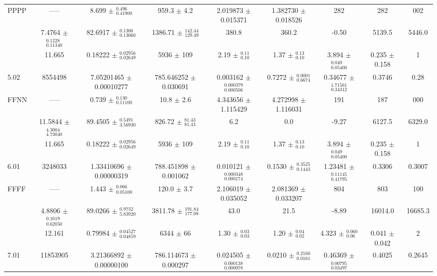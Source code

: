 \documentclass{aastex62}
\begin{document}
\begin{longrotatetable}
\begin{table}[!hbt]
\begin{tabular}{l c c c c c c c c}
PPPP & ----- & 8.699 $\pm$ $^{ 0.496 } _{ 0.41900 }$ & 959.3 $\pm$ 4.2 & 2.019873 $\pm$ 0.015371 & 1.382730 $\pm$ 0.018526 & 282 & 282 & 002 \\
& 7.4764 $\pm$ $^{ 0.1228 } _{ 0.11340 }$ & 82.6917 $\pm$ $^{ 0.1306 } _{ 0.13060 }$ & 1386.71 $\pm$ $^{ 142.44 } _{ 129.49 }$ & 380.8 & 360.2 & -0.50 & 5139.5 & 5446.0 \\
& 11.665 & 0.18222 $\pm$ $^{ 0.02956 } _{ 0.02649 }$ & 5936 $\pm$ 109 & 2.19 $\pm$ $^{ 0.11 } _{ 0.10 }$ & 1.37 $\pm$ $^{ 0.13 } _{ 0.10 }$ & 3.894 $\pm$ $^{ 0.049 } _{ 0.05400 }$ & 0.235 $\pm$ 0.158 & 1 \\
[.2cm]
5.02 & 8554498 & 7.05201465 $\pm$ 0.00010277 & 785.646252 $\pm$ 0.030691 & 0.003162 $\pm$ $^{ 0.000379 } _{ 0.000506 }$ & 0.7272 $\pm$ $^{ 0.0001 } _{ 0.6674 }$ & 0.34677 $\pm$ $^{ 1.71561 } _{ 0.34312 }$ & 0.3746 & 0.28 \\
FFNN & ----- & 0.739 $\pm$ $^{ 0.130 } _{ 0.11100 }$ & 10.8 $\pm$ 2.6 & 4.343656 $\pm$ 1.115429 & 4.272998 $\pm$ 1.116031 & 191 & 187 & 000 \\
& 11.5844 $\pm$ $^{ 4.3004 } _{ 4.73040 }$ & 89.4505 $\pm$ $^{ 0.5491 } _{ 3.56930 }$ & 826.72 $\pm$ $^{ 81.43 } _{ 81.43 }$ & 6.2 & 0.0 & -9.27 & 6127.5 & 6329.0 \\
& 11.665  & 0.18222 $\pm$ $^{ 0.02956 } _{ 0.02649 }$ & 5936 $\pm$ 109 & 2.19 $\pm$ $^{ 0.11 } _{ 0.10 }$ & 1.37 $\pm$ $^{ 0.13 } _{ 0.10 }$ & 3.894 $\pm$ $^{ 0.049 } _{ 0.05400 }$ & 0.235 $\pm$ 0.158 & 1 \\
[.2cm]
6.01 & 3248033 & 1.33410696 $\pm$ 0.00000319 & 788.451898 $\pm$ 0.001062 & 0.010121 $\pm$ $^{ 0.000348 } _{ 0.000174 }$ & 0.1530 $\pm$ $^{ 0.3525 } _{ 0.1443 }$ & 1.23481 $\pm$ $^{ 0.11145 } _{ 0.41795 }$ & 0.3306 & 0.3007 \\
FFFF & ----- & 1.443 $\pm$ $^{ 0.066 } _{ 0.05100 }$ & 120.0 $\pm$ 3.7 & 2.106019 $\pm$ 0.035052 & 2.081369 $\pm$ 0.033207 & 804 & 803 & 100 \\
& 4.8806 $\pm$ $^{ 0.1619 } _{ 0.62050 }$ & 89.0266 $\pm$ $^{ 0.9732 } _{ 5.83920 }$ & 3811.78 $\pm$ $^{ 191.84 } _{ 177.08 }$ & 43.0 & 21.5 & -8.89 & 16014.0 & 16685.3 \\
& 12.161 & 0.79984 $\pm$ $^{ 0.04527 } _{ 0.04859 }$ & 6344 $\pm$ 66 & 1.30 $\pm$ $^{ 0.03 } _{ 0.03 }$ & 1.20 $\pm$ $^{ 0.04 } _{ 0.02 }$ & 4.323 $\pm$ $^{ 0.060 } _{ 0.06 }$ & 0.041 $\pm$ 0.042 & 2 \\
[.2cm]
7.01 & 11853905 & 3.21366892 $\pm$ 0.00000100 & 786.114673 $\pm$ 0.000297 & 0.024505 $\pm$ $^{ 0.000138 } _{ 0.000078 }$ & 0.0210 $\pm$ $^{ 0.2160 } _{ 0.0161 }$ & 0.46369 $\pm$ $^{ 0.00795 } _{ 0.03497 }$ & 0.4025 & 0.2645 \\

\end{tabular}
\end{table}
\end{longrotatetable}
\end{document}
